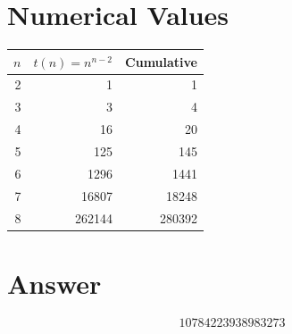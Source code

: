 \documentclass[11pt]{article}
\begin{document}
\section{Numerical Values}
\begin{center}
\begin{tabular}{r|r|r}
$n$ & $t(n)=n^{n-2}$ & Cumulative \\ \hline
2 & 1 & 1 \\
3 & 3 & 4 \\
4 & 16 & 20 \\
5 & 125 & 145 \\
6 & 1296 & 1441 \\
7 & 16807 & 18248 \\
8 & 262144 & 280392
\end{tabular}
\end{center}

\section{Answer}

\[
\boxed{10784223938983273}
\]
\end{document}
